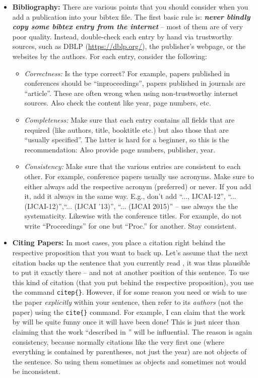 \begin{itemize}
  
  \item \textbf{Bibliography:} There are various points that you should consider when you add a publication into your bibtex file. The first basic rule is: \textbf{\emph{never blindly copy some bibtex entry from the internet}} -- most of them are of very poor quality. Instead, double-check each entry by hand via trustworthy sources, such as DBLP (\url{https://dblp.org/}), the publisher's webpage, or the websites by the authors. For each entry, consider the following:
  \begin{itemize}
    \item \emph{Correctness:} Is the type correct? For example, papers published in conferences should be ``inproceedings'', papers published in journals are ``article''. These are often wrong when using non-trustworthy internet sources. Also check the content like year, page numbers, etc.
    \item \emph{Completeness:} Make sure that each entry contains all fields that are required (like authors, title, booktitle etc.) but also those that are ``usually specified''. The latter is hard for a beginner, so this is the recommendation: Also provide page numbers, publisher, year.
    \item \emph{Consistency:} Make sure that the various entries are consistent to each other. For example, conference papers usually use acronyms. Make sure to either always add the respective acronym (preferred) or never. If you add it, add it always in the same way. E.g., don't add ``..., IJCAI-12'', ``... (IJCAI-12)'',\linebreak ``... (IJCAI '13)'', ``... (IJCAI 2015)'' -- use always the the systematicity. Likewise with the conference titles. For example, do not write ``Proceedings'' for one but ``Proc.'' for another. Stay consistent.
  \end{itemize}
  
  
  \item \textbf{Citing Papers:} In most cases, you place a citation right behind the respective proposition that you want to back up. Let's assume that the next citation backs up the sentence that you currently read \citep{Smith2021Wubalubadubdub}, it was thus plausible to put it exactly there -- and not at another position of this sentence. To use this kind of citation (that you put behind the respective proposition), you use the command \verb!citep{}!. However, if for some reason you need or wish to use the paper \emph{explicitly} within your sentence, then refer to its \emph{authors} (not the paper) using the \verb!cite{}! command. For example, I can claim that the work by \cite{Smith2021Wubalubadubdub} will be quite funny once it will have been done! This is just nicer than claiming that the work ``described in \citep{Smith2021Wubalubadubdub}'' will be influential. The reason is again consistency, because normally citations like the very first one (where everything is contained by parentheses, not just the year) are not objects of the sentence. So using them sometimes as objects and sometimes not would be inconsistent.


\end{itemize}
